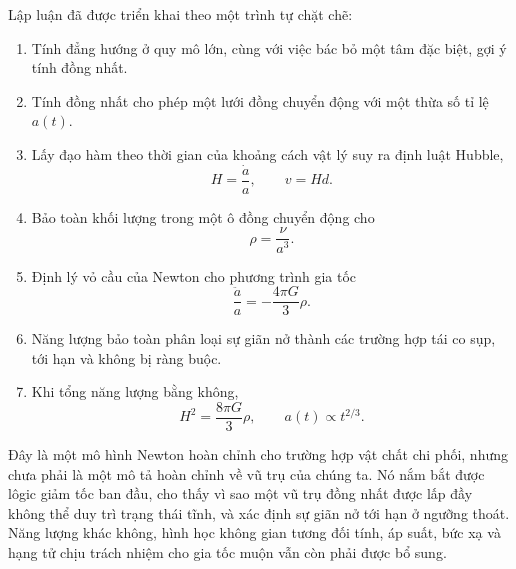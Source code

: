 Lập luận đã được triển khai theo một trình tự chặt chẽ:
\begin{enumerate}
\item Tính đẳng hướng ở quy mô lớn, cùng với việc bác bỏ một tâm đặc biệt, gợi ý tính đồng nhất.
\item Tính đồng nhất cho phép một lưới đồng chuyển động với một thừa số tỉ lệ \(a(t)\).
\item Lấy đạo hàm theo thời gian của khoảng cách vật lý suy ra định luật Hubble,
  \[
  H=\frac{\dot a}{a},
  \qquad
  v=Hd.
  \]
\item Bảo toàn khối lượng trong một ô đồng chuyển động cho
  \[
  \rho=\frac{\nu}{a^3}.
  \]
\item Định lý vỏ cầu của Newton cho phương trình gia tốc
  \[
  \frac{\ddot a}{a}=-\frac{4\pi G}{3}\rho.
  \]
\item Năng lượng bảo toàn phân loại sự giãn nở thành các trường hợp tái co sụp, tới hạn và không bị ràng buộc.
\item Khi tổng năng lượng bằng không,
  \[
  H^2=\frac{8\pi G}{3}\rho,
  \qquad
  a(t)\propto t^{2/3}.
  \]
\end{enumerate}

Đây là một mô hình Newton hoàn chỉnh cho trường hợp vật chất chi phối, nhưng chưa phải là một mô tả hoàn chỉnh về vũ trụ của chúng ta. Nó nắm bắt được lôgic giảm tốc ban đầu, cho thấy vì sao một vũ trụ đồng nhất được lấp đầy không thể duy trì trạng thái tĩnh, và xác định sự giãn nở tới hạn ở ngưỡng thoát. Năng lượng khác không, hình học không gian tương đối tính, áp suất, bức xạ và hạng tử chịu trách nhiệm cho gia tốc muộn vẫn còn phải được bổ sung.
